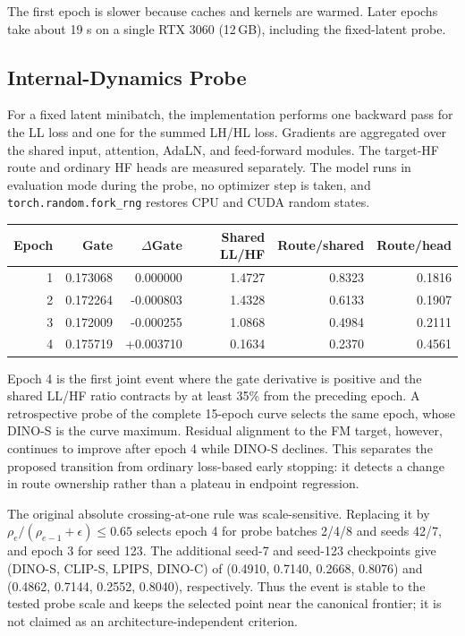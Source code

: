 \documentclass[letterpaper]{article}
\begin{document}
The first epoch is slower because caches and kernels are warmed. Later epochs take about
19 s on a single RTX 3060 (12\,GB), including the fixed-latent probe.

\subsection{Internal-Dynamics Probe}

For a fixed latent minibatch, the implementation performs one backward pass for the LL
loss and one for the summed LH/HL loss. Gradients are aggregated over the shared input,
attention, AdaLN, and feed-forward modules. The target-HF route and ordinary HF heads are
measured separately. The model runs in evaluation mode during the probe, no optimizer step
is taken, and \texttt{torch.random.fork\_rng} restores CPU and CUDA random states.

\begin{center}
\scriptsize
\setlength{\tabcolsep}{2pt}
\begin{tabular}{rrrrrr}
\toprule
Epoch & Gate & $\Delta$Gate & Shared LL/HF & Route/shared & Route/head \\
\midrule
1 & 0.173068 & 0.000000 & 1.4727 & 0.8323 & 0.1816 \\
2 & 0.172264 & -0.000803 & 1.4328 & 0.6133 & 0.1907 \\
3 & 0.172009 & -0.000255 & 1.0868 & 0.4984 & 0.2111 \\
4 & 0.175719 & +0.003710 & 0.1634 & 0.2370 & 0.4561 \\
\bottomrule
\end{tabular}
\normalsize
\end{center}
\label{tab:supp-stopping-traj}

Epoch 4 is the first joint event where the gate derivative is positive and the shared
LL/HF ratio contracts by at least 35\% from the preceding epoch. A retrospective probe of the complete 15-epoch curve selects
the same epoch, whose DINO-S is the curve maximum. Residual alignment to the FM target,
however, continues to improve after epoch 4 while DINO-S declines. This separates the
proposed transition from ordinary loss-based early stopping: it detects a change in route
ownership rather than a plateau in endpoint regression.

The original absolute crossing-at-one rule was scale-sensitive. Replacing it by
$\rho_e/(\rho_{e-1}+\epsilon)\leq0.65$ selects epoch 4 for probe batches 2/4/8 and seeds
42/7, and epoch 3 for seed 123. The additional seed-7 and seed-123 checkpoints give
(DINO-S, CLIP-S, LPIPS, DINO-C) of (0.4910, 0.7140, 0.2668, 0.8076) and
(0.4862, 0.7144, 0.2552, 0.8040), respectively. Thus the event is stable to the tested
probe scale and keeps the selected point near the canonical frontier; it is not claimed as
an architecture-independent criterion.
\end{document}
